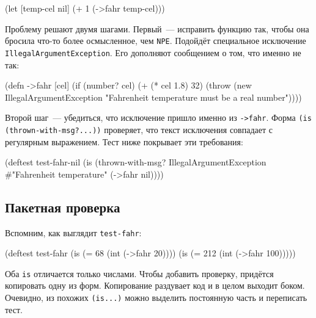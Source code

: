 \begin{english}
  \begin{clojure}
(let [temp-cel nil]
  (+ 1 (->fahr temp-cel)))
  \end{clojure}
\end{english}

\label{illegal-arg}

Проблему решают двумя шагами. Первый~--- исправить функцию так, чтобы она
бросила что-то более осмысленное, чем \verb|NPE|. Подойдёт специальное
исключение \verb|IllegalArgumentException|. Его дополняют сообщением о том,
что именно не так:

\begin{english}
  \begin{clojure}
(defn ->fahr [cel]
  (if (number? cel)
    (+ (* cel 1.8) 32)
    (throw (new IllegalArgumentException
            "Fahrenheit temperature must be a real number"))))
  \end{clojure}
\end{english}

Второй шаг~--- убедиться, что исключение пришло именно из \verb|->fahr|. Форма
\verb|(is (thrown-with-msg?...))| проверяет, что текст исключения совпадает с
регулярным выражением. Тест ниже покрывает эти требования:

\begin{english}
  \begin{clojure}
(deftest test-fahr-nil
  (is (thrown-with-msg?
       IllegalArgumentException #"Fahrenheit temperature"
       (->fahr nil))))
  \end{clojure}
\end{english}

\subsection{Пакетная проверка}

Вспомним, как выглядит \verb|test-fahr|:

\begin{english}
  \begin{clojure}
(deftest test-fahr
  (is (= 68 (int (->fahr 20))))
  (is (= 212 (int (->fahr 100)))))
  \end{clojure}
\end{english}

Оба \verb|is| отличается только числами. Чтобы добавить проверку, придётся
копировать одну из форм. Копирование раздувает код и в целом выходит
боком. Очевидно, из похожих \verb|(is...)| можно выделить постоянную часть и
переписать тест.

